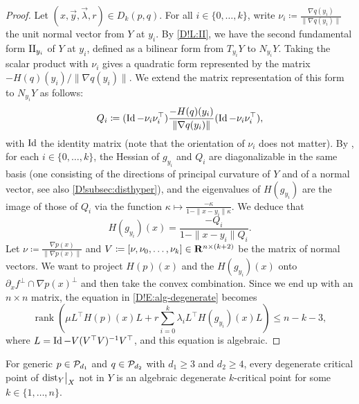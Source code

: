 \begin{proof}
  Let $(x, \vec{y}, \vec{\lambda}, r) \in D_k(p, q)$. For all $i \in \{0, \ldots, k\}$, write $\nu_i \coloneq \frac{\nabla q(y_i)}{\| \nabla q(y_i) \|}$ the unit normal vector from $Y$ at $y_i$. By \cref{D!L:II}, we have the second fundamental form $\textnormal{II}_{y_i}$ of $Y$ at $y_i$, defined as a bilinear form from $T_{y_i} Y$ to $N_{y_i} Y$. Taking the scalar product with $\nu_i$ gives a quadratic form represented by the matrix $-H(q)(y_i) / \| \nabla q(y_i) \|$. We extend the matrix representation of this form to $N_{y_i} Y$ as follows:
  \[
    Q_i \coloneq (\operatorname{Id} - \nu_i \nu_i^\top) \frac{-H(q)(y_i)}{\| \nabla q(y_i) \|} (\operatorname{Id} - \nu_i \nu_i^\top),
  \]
  with $\operatorname{Id}$ the identity matrix (note that the orientation of $\nu_i$ does not matter). By \cite[Lemma 14.17]{GilbargTrudinger1983}, for each $i \in \{0, \ldots, k\}$, the Hessian of $g_{y_i}$ and $Q_i$ are diagonalizable in the same basis (one consisting of the directions of principal curvature of $Y$ and of a normal vector, see also \cref{D!subsec:disthyper}), and the eigenvalues of $H(g_{y_i})$ are the image of those of $Q_i$ via the function $\kappa \mapsto \frac{-\kappa}{1 - \| x - y_i \| \kappa}$. We deduce that
  \[
    H(g_{y_i})(x) = \frac{-Q_i}{1 - \| x - y_i \| Q_i}.
  \]
  Let $\nu \coloneq \frac{\nabla p(x)}{\| \nabla p(x) \|}$ and $V \coloneq [\nu, \nu_0, \ldots, \nu_k] \in \mathbf{R}^{n \times (k + 2)}$ be the matrix of normal vectors. We want to project $H(p)(x)$ and the $H(g_{y_i})(x)$ onto $\partial_x f^\bot \cap \nabla p(x)^\bot$ and then take the convex combination. Since we end up with an $n \times n$ matrix, the equation in \eqref{D!E:alg-degenerate} becomes
  \[
    \operatorname{rank} \left( \mu L^\top H(p)(x) L + r \sum_{i = 0}^k \lambda_i L^\top H(g_{y_i})(x) L \right) \leq n - k - 3,
  \]
  where $L = \operatorname{Id} - V (V^\top V)^{-1} V^\top$, and this equation is algebraic.
\end{proof}

\begin{lemma}
\label{D!L:deg-is-alg-deg}
  For generic $p \in \mathcal{P}_{d_1}$ and $q \in \mathcal{P}_{d_2}$ with $d_1\geq 3$ and $d_2\geq 4$, every degenerate critical point of $\mathord{\operatorname{dist}}_Y\big|_X$ not in $Y$ is an algebraic degenerate $k$-critical point for some $k \in \{1, \ldots, n\}$.
\end{lemma}

